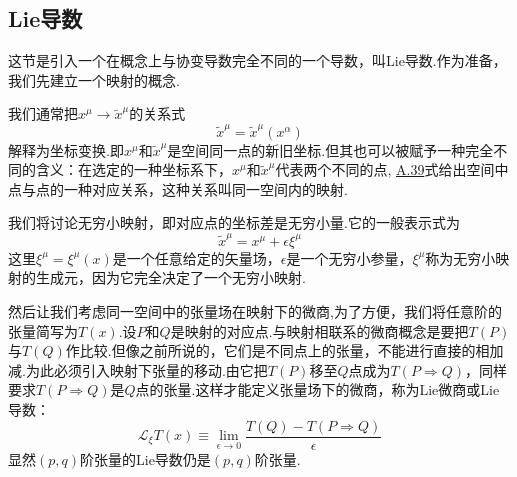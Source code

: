 \documentclass[a4paper]{book}
\begin{document}
\begin{appendix}
\section{Lie导数}
这节是引入一个在概念上与协变导数完全不同的一个导数，叫Lie导数.作为准备，我们先建立一个映射的概念.\par 
我们通常把$x^\mu \rightarrow\tilde{x}^\mu$的关系式
\begin{equation}\label{A.39}
	\tilde{x}^\mu=\tilde{x}^\mu(x^\alpha)
\end{equation}
解释为坐标变换.即$x^\mu$和$\tilde{x}^\mu$是空间同一点的新旧坐标.但其也可以被赋予一种完全不同的含义：在选定的一种坐标系下，$x^\mu$和$\tilde{x}^\mu$代表两个不同的点,
\hyperref[A.39]{A.39}式给出空间中点与点的一种对应关系，这种关系叫同一空间内的映射.\par 
我们将讨论无穷小映射，即对应点的坐标差是无穷小量.它的一般表示式为
\begin{equation}
	\tilde{x}^\mu=x^\mu+\epsilon\xi^\mu
\end{equation}
这里$\xi^\mu=\xi^\mu(x)$是一个任意给定的矢量场，$\epsilon$是一个无穷小参量，$\xi^\mu$称为无穷小映射的生成元，因为它完全决定了一个无穷小映射.\par 
然后让我们考虑同一空间中的张量场在映射下的微商,为了方便，我们将任意阶的张量简写为$T(x)$.设$P$和$Q$是映射的对应点.与映射相联系的微商概念是要把$T(P)$与$T(Q)$作比较.但像之前所说的，它们是不同点上的张量，不能进行直接的相加减.为此必须引入映射下张量的移动.由它把$T(P)$移至$Q$点成为$T(P\Rightarrow Q)$，同样要求$T(P\Rightarrow Q)$是$Q$点的张量.这样才能定义张量场下的微商，称为Lie微商或Lie导数：
\begin{equation}
	\mathcal{L}_{\xi}T(x)\equiv \lim_{\epsilon\rightarrow 0}\frac{T(Q)-T(P\Rightarrow Q)}{\epsilon}
\end{equation}
显然$(p,q)$阶张量的Lie导数仍是$(p,q)$阶张量.







































\end{appendix}
\end{document}
